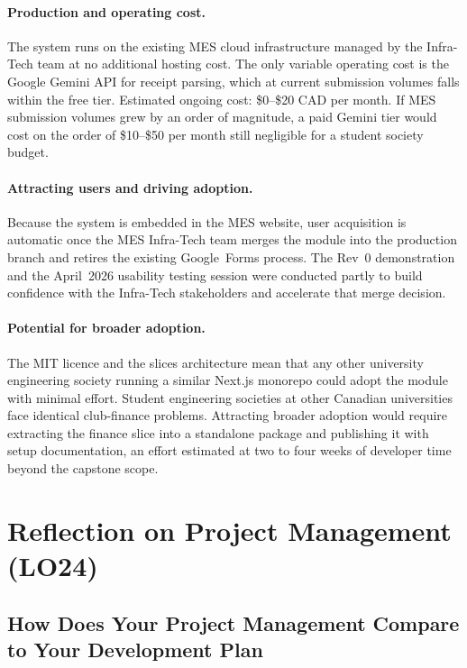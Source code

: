 \documentclass{article}
\begin{document}
\paragraph{Production and operating cost.}
The system runs on the existing MES cloud infrastructure managed by the
Infra-Tech team at no additional hosting cost.  The only variable operating
cost is the Google Gemini API for receipt parsing, which at current
submission volumes falls within the free tier.  Estimated ongoing cost:
\$0--\$20 CAD per month.  If MES submission volumes grew by an order of
magnitude, a paid Gemini tier would cost on the order of \$10--\$50 per
month still negligible for a student society budget.

\paragraph{Attracting users and driving adoption.}
Because the system is embedded in the MES website, user acquisition is
automatic once the MES Infra-Tech team merges the module into the
production branch and retires the existing Google~Forms process.  The
Rev~0 demonstration and the April~2026 usability testing session were
conducted partly to build confidence with the Infra-Tech stakeholders and
accelerate that merge decision.

\paragraph{Potential for broader adoption.}
The MIT licence and the slices architecture mean that any other university
engineering society running a similar Next.js monorepo could adopt the
module with minimal effort.  Student engineering societies at other
Canadian universities face identical club-finance problems.  Attracting
broader adoption would require extracting the finance slice into a
standalone package and publishing it with setup documentation, an effort
estimated at two to four weeks of developer time beyond the capstone scope.

\section{Reflection on Project Management (LO24)}

\subsection{How Does Your Project Management Compare to Your Development Plan}
\end{document}
